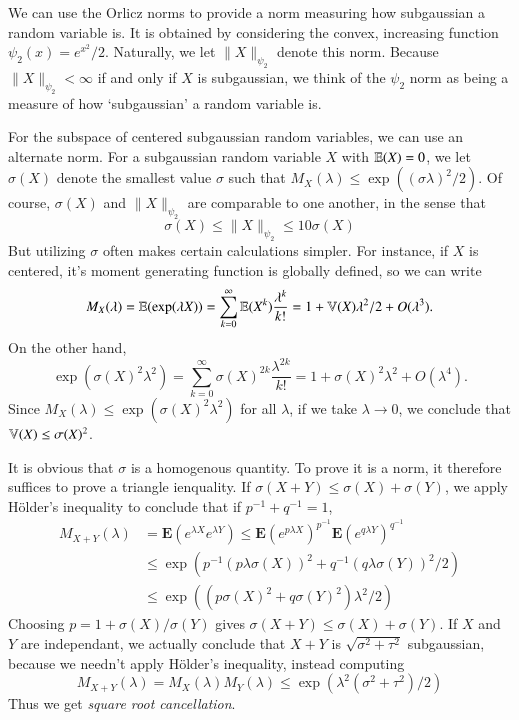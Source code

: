We can use the Orlicz norms to provide a norm measuring how subgaussian a random variable is. It is obtained by considering the convex, increasing function $\psi_2(x) = e^{x^2}/2$. Naturally, we let $\| X \|_{\psi_2}$ denote this norm. Because $\| X \|_{\psi_2} < \infty$ if and only if $X$ is subgaussian, we think of the $\psi_2$ norm as being a measure of how `subgaussian' a random variable is.

For the subspace of centered subgaussian random variables, we can use an alternate norm. For a subgaussian random variable $X$ with $\operatorname{\mathbb{E}}(X) = 0$, we let $\sigma(X)$ denote the smallest value $\sigma$ such that $M_X(\lambda) \leq \exp((\sigma \lambda)^2/2)$. Of course, $\sigma(X)$ and $\| X \|_{\psi_2}$ are comparable to one another, in the sense that
%
\[ \sigma(X) \leq \| X \|_{\psi_2} \leq 10 \sigma(X) \]
%
But utilizing $\sigma$ often makes certain calculations simpler. For instance, if $X$ is centered, it's moment generating function is globally defined, so we can write
%
\[ M_X(\lambda) = \operatorname{\mathbb{E}}(\exp(\lambda X)) = \sum_{k = 0}^\infty \operatorname{\mathbb{E}}(X^k) \frac{\lambda^k}{k!} = 1 + \operatorname{\mathbb{V}}(X) \lambda^2/2 + O(\lambda^3). \]
%
On the other hand,
%
\[ \exp(\sigma(X)^2 \lambda^2) = \sum_{k = 0}^\infty \sigma(X)^{2k} \frac{\lambda^{2k}}{k!} = 1 + \sigma(X)^2 \lambda^2 + O(\lambda^4). \]
%
Since $M_X(\lambda) \leq \exp(\sigma(X)^2 \lambda^2)$ for all $\lambda$, if we take $\lambda \to 0$, we conclude that $\operatorname{\mathbb{V}}(X) \leq \sigma(X)^2$.

It is obvious that $\sigma$ is a homogenous quantity. To prove it is a norm, it therefore suffices to prove a triangle ienquality. If $\sigma(X+Y) \leq \sigma(X) + \sigma(Y)$, we apply H\"{o}lder's inequality to conclude that if $p^{-1} + q^{-1} = 1$,
%
\begin{align*}
    M_{X+Y}(\lambda) &= \mathbf{E}(e^{\lambda X} e^{\lambda Y}) \leq \mathbf{E}(e^{p \lambda X})^{p^{-1}} \mathbf{E}(e^{q \lambda Y})^{q^{-1}}\\
    &\leq \exp(p^{-1} (p \lambda \sigma(X))^2 + q^{-1} (q \lambda \sigma(Y))^2/2)\\
    &\leq \exp((p \sigma(X)^2 + q \sigma(Y)^2) \lambda^2/2)
\end{align*}
%
Choosing $p = 1 + \sigma(X)/\sigma(Y)$ gives $\sigma(X+Y) \leq \sigma(X) + \sigma(Y)$. If $X$ and $Y$ are independant, we actually conclude that $X + Y$ is $\sqrt{\sigma^2 + \tau^2}$ subgaussian, because we needn't apply H\"{o}lder's inequality, instead computing
%
\[ M_{X+Y}(\lambda) = M_X(\lambda) M_Y(\lambda) \leq \exp(\lambda^2 (\sigma^2 + \tau^2)/2) \]
%
Thus we get \emph{square root cancellation}.

